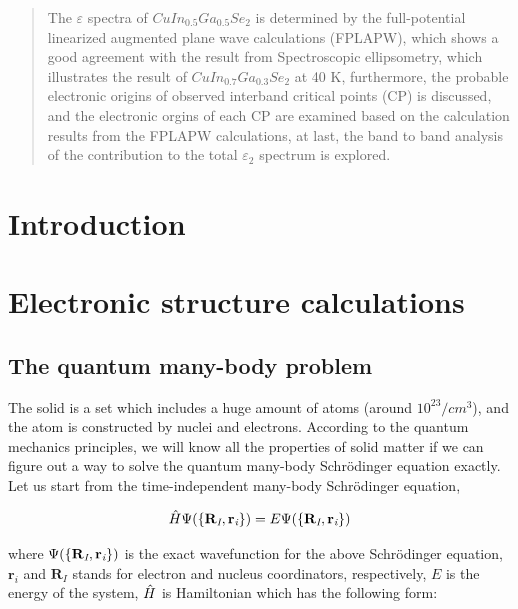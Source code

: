 \documentclass[a4paper]{report}
\begin{document}
\begin{abstract}
\noindent The $\varepsilon$ spectra of $CuIn_{0.5}Ga_{0.5}Se_2$ is determined by the full-potential linearized augmented plane wave calculations (FPLAPW), which shows a good 
agreement with the result from Spectroscopic ellipsometry, which illustrates the result of $CuIn_{0.7}Ga_{0.3}Se_2$ at 40 K, furthermore, the probable electronic origins of 
observed interband critical points (CP) is discussed, and the electronic orgins of each CP are examined based on the calculation results from the FPLAPW calculations, at 
last, the band to band analysis of the contribution to the total ${\varepsilon_2}$ spectrum is explored.

\end{abstract}


\chapter{Introduction }









\chapter{Electronic structure calculations }
\label{ch:dft}

\section{The quantum many-body problem}
\label{ch:mb}

\noindent The solid is a set which includes a huge amount of atoms (around $10^{23}/cm^3$), and the atom is constructed by nuclei and electrons. 
According to the quantum mechanics principles, we will know all the properties of solid matter if we can figure out a way to solve 
the quantum many-body Schrödinger equation exactly. Let us start from the time-independent many-body Schrödinger equation,

 
\begin{equation}\label{ssth}
 {\hat{H}} {\Psi(\{\bf{R}_\textit{I}, \bf{r}_\textit{i} \})} = {E} {\Psi(\{\bf{R}_\textit{I}, \bf{r}_\textit{i} \})}
\end{equation}

\noindent where $\Psi(\{\bf{R}_\textit{I}, \bf{r}_\textit{i} \})$  is the exact wavefunction for the above Schrödinger equation, $\textbf{r}_\textit{i}$ and $\textbf{R}_\textit{I}$  stands for electron and nucleus coordinators,
respectively, $E$ is the energy of the system, $\hat{H}$ is Hamiltonian which has the following form:
\end{document}
